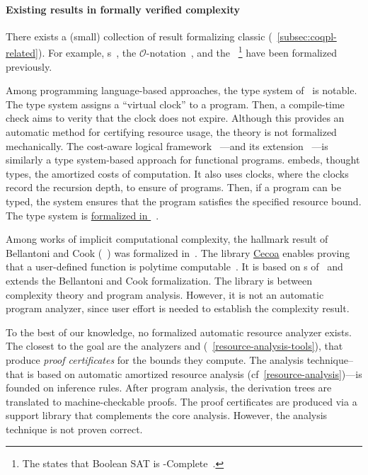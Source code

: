 \paragraph*{Existing results in formally verified complexity}
There exists a (small) collection of result formalizing classic  (\cf~\autoref{subsec:coqpl-related}). For example, s~\cite{forster2020}, the
\(\mathcal{O}\)-notation~\cite{gueneau2018}, and the ~\cite{gaher2021}\footnote{The
 states that Boolean SAT is
-Complete~\cite{cook1971, levin1973}.} have been formalized
previously.

Among programming language-based approaches, the type system of~\cite{crary2000}
is notable. The type system assigns a \enquote{virtual clock} to a program.
Then, a compile-time check aims to verity that the clock does not expire.
Although this provides an automatic method for certifying resource usage, the
theory is not formalized mechanically. The cost-aware logical framework
~\cite{niu2022}---and its extension
~\cite{grodin2024}---is similarly a type system-based approach for
functional programs.   embeds, thought types, the amortized
costs of computation. It also uses clocks, where the clocks
record the recursion depth, to ensure  of programs. Then, if a
program can be typed, the  system ensures that the program satisfies
the specified resource bound. The type system is
\href{https://github.com/HarrisonGrodin/agda-calf}{formalized in
}~\cite{grodin2023}.

Among works of implicit computational complexity, the hallmark result of
Bellantoni and Cook (~) was formalized
in~\textcite{heraud2011}. The  library
\href{https://github.com/davidnowak/cecoa}{Cecoa}{} enables proving
that a user-defined function is polytime computable~\cite{feree2018}. It is
based on s of~\textcite{marion2000} and extends the
Bellantoni and Cook formalization. The  library is between complexity
theory and program analysis. However, it is not an automatic program analyzer,
since user effort is needed to establish the complexity result.

To the best of our knowledge, no formalized automatic resource analyzer exists.
The closest to the goal are the analyzers  and 
(\cf~\autoref{resource-analysis-tools}), that produce \emph{proof certificates}
for the bounds they compute. The analysis technique--that is based on automatic
amortized resource analysis
(cf~\autoref{resource-analysis})---is founded on inference rules. After program
analysis, the derivation trees are translated to machine-checkable proofs. The
proof certificates are produced via a support library that complements the core
analysis. However, the analysis {technique} is not proven correct.

